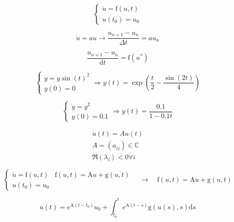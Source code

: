 
\begin{equation} 
    \left\{\begin{array}{l}{\dot{u}=\mathrm{f}(u, t)} \\ {u\left(t_{0}\right)=u_{0}}\end{array}\right.
\end{equation}

\begin{equation} 
    \dot{u}=a u \rightarrow \frac{u_{n+1}-u_{n}}{\Delta t}=a u_{n}
\end{equation}

\begin{equation} 
    \frac{u_{n+1}-u_{n}}{\mathrm{d} t}=\mathrm{f}\left(u^{*}\right)
\end{equation}

\begin{equation} 
    \left\{\begin{array}{l}{\dot{y}=y \sin (t)^{2}} \\ {y(0)=0}\end{array}\right. \Rightarrow y(t)=\exp \left(\frac{t}{2}-\frac{\sin (2 t)}{4}\right)
\end{equation}

\begin{equation} 
    \left\{\begin{array}{l}{\dot{y}=y^{2}} \\ {y(0)=0.1}\end{array}\right. \Rightarrow y(t)=\frac{0.1}{1-0.1 t}
\end{equation}

\begin{equation} 
    \begin{array}{c}{\dot{u}(t)=A u(t)} \\ {A=\left(a_{i j}\right) \in \mathbb{C}} \\ {\Re\left(\lambda_{i}\right)<0 \forall i}\end{array}
\end{equation}

\begin{equation} 
    \left\{\begin{array}{ll}{\dot{u}=\mathrm{f}(u, t)} & {\mathrm{f}(u, t)=\mathrm{A} u+\mathrm{g}(u, t)} \\ {u\left(t_{0}\right)=u_{0}}\end{array}\right. \quad \rightarrow \quad \mathrm{f}(u, t)=\mathrm{A} u+\mathrm{g}(u, t)
\end{equation}

\begin{equation} 
    u(t)=e^{\mathrm{A}\left(t-t_{0}\right)} u_{0}+\int_{t_{0}}^{t} e^{\mathrm{A}(t-s)} \mathrm{g}(u(s), s) \mathrm{d} s
\end{equation}

